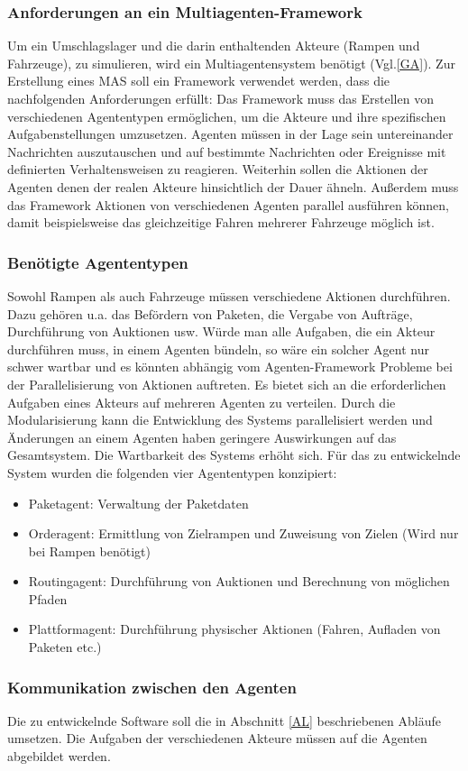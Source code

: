 \subsubsection{Anforderungen an ein Multiagenten-Framework}
Um ein Umschlagslager und die darin enthaltenden Akteure (Rampen und Fahrzeuge), zu simulieren, wird ein Multiagentensystem benötigt (Vgl.\ref{GA}). Zur Erstellung eines MAS soll ein Framework verwendet werden, dass die nachfolgenden Anforderungen erfüllt: Das Framework muss das Erstellen von verschiedenen Agententypen ermöglichen, um die Akteure und ihre spezifischen Aufgabenstellungen umzusetzen. Agenten müssen in der Lage sein untereinander Nachrichten auszutauschen und auf bestimmte Nachrichten oder Ereignisse mit definierten Verhaltensweisen zu reagieren. Weiterhin sollen die Aktionen der Agenten denen der realen Akteure hinsichtlich der Dauer ähneln. Außerdem muss das Framework Aktionen von verschiedenen Agenten parallel ausführen können, damit beispielsweise das gleichzeitige Fahren mehrerer Fahrzeuge möglich ist.
\subsubsection{Benötigte Agententypen}
Sowohl Rampen als auch Fahrzeuge müssen verschiedene Aktionen durchführen. Dazu gehören u.a. das Befördern von Paketen, die Vergabe von Aufträge, Durchführung von Auktionen usw. Würde man alle Aufgaben, die ein Akteur durchführen muss, in einem Agenten bündeln, so wäre ein solcher Agent nur schwer wartbar und es könnten abhängig vom Agenten-Framework Probleme bei der Parallelisierung von Aktionen auftreten. Es bietet sich an die erforderlichen Aufgaben eines Akteurs auf mehreren Agenten zu verteilen. Durch die Modularisierung kann die Entwicklung des Systems parallelisiert werden und Änderungen an einem Agenten haben geringere Auswirkungen auf das Gesamtsystem. Die Wartbarkeit des Systems erhöht sich. Für das zu entwickelnde System wurden die folgenden vier Agententypen konzipiert:  
\begin{itemize}
\item Paketagent: Verwaltung der Paketdaten
\item Orderagent: Ermittlung von Zielrampen und Zuweisung von Zielen (Wird nur bei Rampen benötigt)
\item Routingagent: Durchführung von Auktionen und Berechnung von möglichen Pfaden
\item Plattformagent: Durchführung physischer Aktionen (Fahren, Aufladen von Paketen etc.)
\end{itemize}
\subsubsection{Kommunikation zwischen den Agenten}
Die zu entwickelnde Software soll die in Abschnitt \ref{AL} beschriebenen Abläufe umsetzen. Die Aufgaben der verschiedenen Akteure müssen auf die Agenten abgebildet werden. 